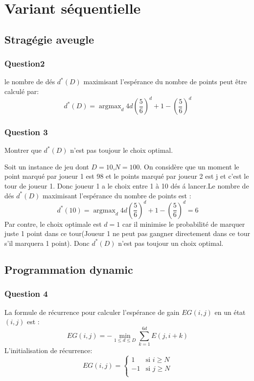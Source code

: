 \documentclass[12pt,a4paper]{article}
\begin{document}
\section{Variant séquentielle}
\subsection{Stragégie aveugle}
\subsubsection{Question2}
le nombre de d\'es $d^{*}\left(D\right)$ maximisant l'espérance du nombre de points peut \^etre calculé par:
\begin{equation}\nonumber
d^{*}\left(D\right)=\mathop{\arg\max}_{d}4d(\dfrac{5}{6})^d+1-(\dfrac{5}{6})^d
\end{equation}

\subsubsection{Question 3}
Montrer que $d^{*}\left(D\right)$ n'est pas toujour le choix optimal.

Soit un instance de jeu dont $D=10$,$N=100$. On consid\`ere que un moment le point marqué par joueur 1 est 98 et le points marqué par joueur 2 est j et c'est le tour de joueur 1. Donc joueur 1 a le choix entre 1 à 10 d\'es \'a lancer.Le nombre de d\'es $d^{*}\left(D\right)$ maximisant l'esp\'erance du nombre de points est :
\begin{equation}\nonumber
d^{*}\left(10\right)=\mathop{\arg\max}_{d}4d(\dfrac{5}{6})^d+1-(\dfrac{5}{6})^d=6
\end{equation}
Par contre, le choix optimale est $d=1$ car il minimise le probabilité de marquer juste 1 point dans ce tour(Joueur 1 ne peut pas gangner directement dans ce tour s'il marquera 1 point). Donc $d^{*}\left(D\right)$ n'est pas toujour un choix optimal.
\subsection{Programmation dynamic}
\subsubsection{Question 4}
La formule de r\'ecurrence pour calculer l'esp\'erance de gain $EG(i, j)$ en un état $(i, j)$ est :
\begin{equation}\nonumber
EG(i,j)=-\mathop{\min}_{1 \leq d  \leq D}\sum\limits_{k=1}^{6d}E(j,i+k)
\end{equation}
L'initialisation de r\'ecurrence:
\begin{equation*}
\left .EG(i,j) = \begin{cases} 
      1 & \text{si } i \geq N \\
      -1 & \text{si } j \geq N \\
      
   \end{cases} \right.
\end{equation*}
\end{document}
